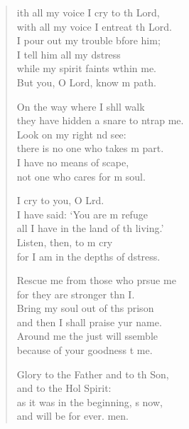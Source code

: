 \begin{verse}%
\begin{patverse}
ith all my voice I cry to th Lord,\Med\\
    with all my voice I entreat th Lord.\\
I pour out my trouble bfore him;\Med\\
    I tell him all my d\pointup{\i}stress\\
while my spirit faints w\pointup{\i}thin me.\Med\\
    But you, O Lord, know m path.

On the way where I shll walk\Med\\
    they have hidden a snare to ntrap me.\\
Look on my right nd see:\Med\\
    there is no one who takes m part.\\
I have no means of scape,\Med\\
    not one who cares for m soul.

I cry to you, O Lrd.\Flex\\
    I have said: ‘You are m refuge\Med\\
    all I have in the land of th living.’\\
Listen, then, to m cry\Med\\
    for I am in the depths of d\pointup{\i}stress.

Rescue me from those who prsue me\Med\\
    for they are stronger thn I.\\
Bring my soul out of th\pointup{\i}s prison\Med\\
    and then I shall praise yur name.\\
Around me the just will ssemble\Med\\
    because of your goodness t me.

Glory to the Father and to th Son,\Med\\
    and to the Hol Spirit:\\
as it was in the beginning, \pointup{\i}s now,\Med\\
    and will be for ever. men.
\end{patverse}
\end{verse}
